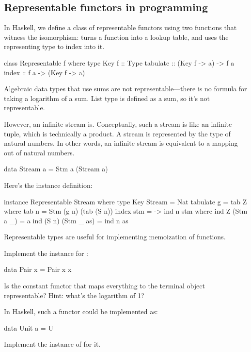 \documentclass[DaoFP]{subfiles}
\begin{document}
\subsection{Representable functors in programming}

In Haskell, we define a class of representable functors using two functions that witness the isomorphism:  turns a function into a lookup table, and  uses the representing type  to index into it.

\begin{haskell}
class Representable f where
  type Key f :: Type
  tabulate :: (Key f -> a) -> f a
  index    :: f a -> (Key f -> a)
\end{haskell}

Algebraic data types that use sums are not representable---there is no formula for taking a logarithm of a sum. List type is defined as a sum, so it's not representable. 

However, an infinite stream is. Conceptually, such a stream is like an infinite tuple, which is technically a product. A stream is represented by the type of natural numbers. In other words, an infinite stream is equivalent to a mapping out of natural numbers. 
\begin{haskell}
data Stream a = Stm a (Stream a)
\end{haskell}
Here's the instance definition:
\begin{haskell}
instance Representable Stream where
  type Key Stream = Nat
  tabulate g = tab Z
    where
      tab n = Stm (g n) (tab (S n))
  index stm = \n -> ind n stm
    where
      ind Z (Stm a _) = a
      ind (S n) (Stm _ as) = ind n as
\end{haskell}
Representable types are useful for implementing memoization of functions.

\begin{exercise}
Implement the  instance for :
\begin{haskell}
data Pair x = Pair x x
\end{haskell}
\end{exercise}

\begin{exercise}
Is the constant functor that maps everything to the terminal object representable? Hint: what's the logarithm of 1?

In Haskell, such a functor could be implemented as:
\begin{haskell}
data Unit a = U
\end{haskell}
Implement the instance of  for it.
\end{exercise}
\end{document}
